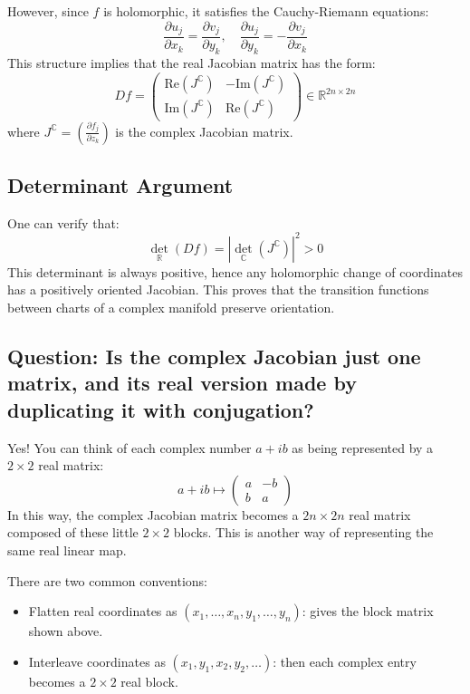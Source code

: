 However, since \(f\) is holomorphic, it satisfies the Cauchy-Riemann equations:
\[
\frac{\partial u_j}{\partial x_k} = \frac{\partial v_j}{\partial y_k}, \quad
\frac{\partial u_j}{\partial y_k} = -\frac{\partial v_j}{\partial x_k}
\]
This structure implies that the real Jacobian matrix has the form:
\[
Df = 
\begin{pmatrix}
\mathrm{Re}(J^{\mathbb{C}}) & -\mathrm{Im}(J^{\mathbb{C}}) \\
\mathrm{Im}(J^{\mathbb{C}}) & \mathrm{Re}(J^{\mathbb{C}})
\end{pmatrix}
\in \mathbb{R}^{2n \times 2n}
\]
where \( J^{\mathbb{C}} = \left( \frac{\partial f_j}{\partial z_k} \right) \) is the complex Jacobian matrix.

\subsection*{Determinant Argument}

One can verify that:
\[
\det_{\mathbb{R}}(Df) = \left| \det_{\mathbb{C}}(J^{\mathbb{C}}) \right|^2 > 0
\]
This determinant is always positive, hence any holomorphic change of coordinates has a positively oriented Jacobian. This proves that the transition functions between charts of a complex manifold preserve orientation.

\subsection*{Question: Is the complex Jacobian just one matrix, and its real version made by duplicating it with conjugation?}

Yes! You can think of each complex number \( a + ib \) as being represented by a \(2 \times 2\) real matrix:
\[
a + ib \mapsto \begin{pmatrix}
a & -b \\
b & a
\end{pmatrix}
\]
In this way, the complex Jacobian matrix becomes a \(2n \times 2n\) real matrix composed of these little \(2 \times 2\) blocks. This is another way of representing the same real linear map.

There are two common conventions:
\begin{itemize}
    \item Flatten real coordinates as \( (x_1, \dots, x_n, y_1, \dots, y_n) \): gives the block matrix shown above.
    \item Interleave coordinates as \( (x_1, y_1, x_2, y_2, \dots) \): then each complex entry becomes a \(2 \times 2\) real block.
\end{itemize}

